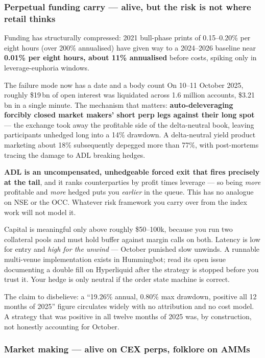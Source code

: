 \documentclass[11pt,a4paper]{article}
\newcommand{\srcnote}[1]{{\footnotesize\color{soft}#1\par}}
\begin{document}
\subsubsection{Perpetual funding carry --- alive, but the risk is not where retail thinks}

Funding has structurally compressed: 2021 bull-phase prints of 0.15--0.20\% per
eight hours (over 200\% annualised) have given way to a 2024--2026 baseline near
\textbf{0.01\% per eight hours, about 11\% annualised} before costs, spiking only
in leverage-euphoria windows.

\begin{keyfact}{The failure mode now has a date and a body count}
On 10--11 October 2025, roughly \$19\,bn of open interest was liquidated across
1.6 million accounts, \$3.21\,bn in a single minute. The mechanism that matters:
\textbf{auto-deleveraging forcibly closed market makers' short perp legs against
their long spot} --- the exchange took away the profitable side of the
delta-neutral book, leaving participants unhedged long into a 14\% drawdown. A
delta-neutral yield product marketing about 18\% subsequently depegged more than
77\%, with post-mortems tracing the damage to ADL breaking hedges.

\textbf{ADL is an uncompensated, unhedgeable forced exit that fires precisely at
the tail}, and it ranks counterparties by profit times leverage --- so being
\emph{more} profitable and \emph{more} hedged puts you \emph{earlier} in the
queue. This has no analogue on NSE or the OCC. Whatever risk framework you carry
over from the index work will not model it.
\end{keyfact}

Capital is meaningful only above roughly \$50--100k, because you run two collateral
pools and must hold buffer against margin calls on both. Latency is low for entry
and \emph{high for the unwind} --- October punished slow unwinds. A runnable
multi-venue implementation exists in Hummingbot; read its open issue documenting a
double fill on Hyperliquid after the strategy is stopped before you trust it. Your
hedge is only neutral if the order state machine is correct.

\srcnote{The claim to disbelieve: a ``19.26\% annual, 0.80\% max drawdown, positive
all 12 months of 2025'' figure circulates widely with no attribution and no cost
model. A strategy that was positive in all twelve months of 2025 was, by
construction, not honestly accounting for October.}

\subsubsection{Market making --- alive on CEX perps, folklore on AMMs}
\end{document}
